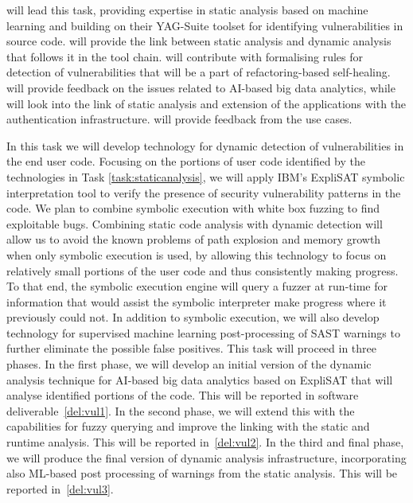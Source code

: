 \begin{Workpackage}{\thewpno}
\begin{Task}
\YAGshort{} will lead this task, providing expertise in static analysis based on machine learning and building on their YAG-Suite toolset for identifying vulnerabilities in source code. \IBMshort{} will provide the link between static analysis and dynamic analysis that follows it in the \TheProject{} tool chain. \SAshort{} will contribute with formalising rules for detection of vulnerabilities that will be a part of refactoring-based self-healing. \UODshort{} will provide feedback on the issues related to AI-based big data analytics, while \COGNIshort{} will look into the link of static analysis and extension of the applications with the authentication infrastructure. \SOPRAshort{} will provide feedback from the use cases.


\end{Task}

\begin{Task}
\TaskResults{%
\ref{del:vul1},
\ref{del:vul2},
\ref{del:vul3}
}
\TaskHeader{}
In this task we will develop technology for dynamic detection of vulnerabilities in the end user code. Focusing on the portions of user code identified by the technologies in Task \ref{task:staticanalysis}, we will apply IBM's ExpliSAT symbolic interpretation tool to verify the presence of security vulnerability patterns in the code. We plan to combine symbolic execution with white box fuzzing to find exploitable bugs. Combining static code analysis with dynamic detection will allow us to avoid the known problems of path explosion and memory growth when only symbolic execution is used, by allowing this technology to focus on relatively small portions of the user code and thus consistently making progress. To that end, the symbolic execution engine will query a fuzzer at run-time for information that would assist the symbolic interpreter make progress where it previously could not. In addition to symbolic execution, we will also develop technology for supervised machine learning post-processing of SAST warnings to further eliminate the possible false positives. This task will proceed in three phases. In the first phase, we will develop an initial version of the dynamic analysis technique for AI-based big data analytics based on ExpliSAT that will analyse identified portions of the code. This will be reported in software deliverable~\ref{del:vul1}. In the second phase, we will extend this with the capabilities for fuzzy querying and improve the linking with the static and runtime analysis. This will be reported in~\ref{del:vul2}. In the third and final phase, we will produce the final version of dynamic analysis infrastructure, incorporating also ML-based post processing of warnings from the static analysis. This will be reported in~\ref{del:vul3}. 


\end{Task}
\end{Workpackage}
